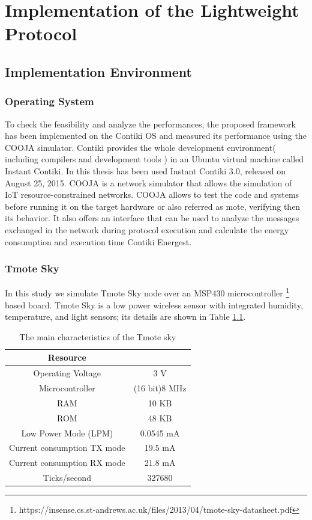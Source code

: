 \chapter{Implementation of the Lightweight Protocol}
\label{ch:implementationProto}
\section{Implementation Environment}
\subsection{Operating System}
To check the feasibility and analyze the performances, the proposed  framework has been  implemented on  the  Contiki OS and measured its performance using the COOJA simulator\cite{Osterlind2006}.  
Contiki provides the whole development environment( including compilers and development tools ) in an Ubuntu virtual machine called Instant Contiki.
In this thesis has been used Instant Contiki 3.0, released on August 25, 2015. 
COOJA  is  a  network  simulator  that  allows  the  simulation  of  IoT  resource-constrained  networks. 
COOJA allows to test the code and systems before running it on the target hardware or also referred as mote, verifying then its behavior.
It also  offers  an interface that can be used to analyze the messages exchanged in  the  network  during  protocol  execution  and  calculate  the energy  consumption  and  execution  time Contiki  Energest.

\subsection{Tmote Sky}
In this study we simulate Tmote Sky node over an MSP430 microcontroller \footnote{https://insense.cs.st-andrews.ac.uk/files/2013/04/tmote-sky-datasheet.pdf} based board.
Tmote Sky is a low power wireless sensor with integrated humidity, temperature, and light sensors;
its details are shown in Table \ref{tmote}.
\begin{table}[H]
\caption{The main characteristics of the Tmote sky}
\label{tmote}
\begin{center}
\begin{tabular}{|c||c|}
\hline
\bf Resource & \\
\hline
Operating Voltage & 3 V\\
\hline
Microcontroller & (16 bit)8 MHz\\
\hline
RAM & 10 KB\\
\hline
ROM & 48 KB\\
\hline
Low Power Mode (LPM) & 0.0545 mA\\
\hline
Current consumption TX mode & 19.5 mA\\
\hline
Current consumption RX mode & 21.8 mA\\
\hline
Ticks/second & 327680\\
\hline
\end{tabular}
\end{center}
\end{table}


